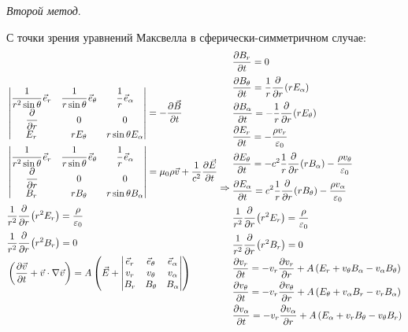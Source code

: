 \textit{Второй метод}.

С точки зрения уравнений Максвелла в сферически-симметричном случае:
\[
	\begin{aligned}
		& \begin{vmatrix}
			\cfrac{1}{r^2 \sin \theta} \,\vec{e}_r & \cfrac{1}{r \sin \theta}\, \vec{e}_\theta & \cfrac{1}{r} \, \vec{e}_\alpha \\
			\cfrac{\partial}{\partial r} & 0 & 0 \\
			E_r & r E_\theta & r \sin \theta E_\alpha
		\end{vmatrix}
		= 
		- \frac{\partial \vec{B}}{\partial t} \\
		& \begin{vmatrix}
		\cfrac{1}{r^2 \sin \theta} \,\vec{e}_r & \cfrac{1}{r \sin \theta}\, \vec{e}_\theta & \cfrac{1}{r} \, \vec{e}_\alpha \\
		\cfrac{\partial}{\partial r} & 0 & 0 \\
		B_r & r B_\theta & r \sin \theta B_\alpha
		\end{vmatrix}
		= 
		\mu_0 \rho \vec{v} + \frac{1}{c^2} \frac{\partial \vec{E}}{\partial t} \\
		& \frac{1}{r^2} \cfrac{\partial}{\partial r} \left( r^2 E_r\right) = \frac{\rho}{\varepsilon_0} \\ 
		& \frac{1}{r^2} \cfrac{\partial}{\partial r} \left( r^2 B_r\right) = 0 \\
		& \left(\frac{\partial \vec{v}}{\partial t} + \vec{v}\cdot\nabla\vec{v}\right) = A \left(\vec{E} + 
		\begin{vmatrix}
		\vec{e}_r & \vec{e}_\theta & \vec{e}_\alpha \\
		v_r & v_\theta & v_\alpha \\
		B_r & B_\theta & B_\alpha
		\end{vmatrix} \right)
	\end{aligned}
	\Rightarrow
	\begin{aligned}
		& \frac{\partial B_r}{\partial t} = 0 \\
		& \frac{\partial B_\theta}{\partial t} = \frac{1}{r} \cfrac{\partial}{\partial r} \left( r E_\alpha\right) \\
		& \frac{\partial B_\alpha}{\partial t} = - \frac{1}{r} \cfrac{\partial}{\partial r} \left( r E_\theta\right) \\
		& \frac{\partial E_r}{\partial t} = - \frac{\rho v_r}{\varepsilon_0} \\
		& \frac{\partial E_\theta}{\partial t} = - c^2 \frac{1}{r} \cfrac{\partial}{\partial r} \left( r B_\alpha\right) - \frac{\rho v_\theta}{\varepsilon_0} \\
		& \frac{\partial E_\alpha}{\partial t} = c^2\frac{1}{r} \cfrac{\partial}{\partial r} \left( r B_\theta\right) - \frac{\rho v_\alpha}{\varepsilon_0}\\
		& \frac{1}{r^2} \cfrac{\partial}{\partial r} \left( r^2 E_r\right) = \frac{\rho}{\varepsilon_0} \\ 
		& \frac{1}{r^2} \cfrac{\partial}{\partial r} \left( r^2 B_r\right) = 0 \\
		& \frac{\partial v_r}{\partial t} = - v_r\frac{\partial v_r}{\partial r} + A\left(E_r + v_\theta B_\alpha - v_\alpha B_\theta\right) \\
		& \frac{\partial v_\theta}{\partial t} = - v_r\frac{\partial v_\theta}{\partial r} + A\left(E_\theta + v_\alpha B_r - v_r B_\alpha\right) \\
		& \frac{\partial v_\alpha}{\partial t} = - v_r\frac{\partial v_\alpha}{\partial r} + A\left(E_\alpha + v_r B_\theta - v_\theta B_r\right) \\
	\end{aligned}
\] 
